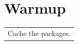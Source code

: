 \documentclass[letterpaper,11pt]{article}
\begin{document}
\faEnvelope\ \faLinkedin\ \faGithub\ \faInternetExplorer\ \faLink\ \faPhone\ \faMapMarker
\section{Warmup}
\begin{tabularx}{\textwidth}{>{\raggedright\arraybackslash}X}
  Cache the packages.
\end{tabularx}
\end{document}
